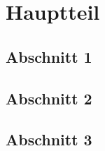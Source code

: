
\chapter{Hauptteil}\label{chapter: Hauptteil}

	\section{Abschnitt 1}
	
	\section{Abschnitt 2}
	
	\section{Abschnitt 3}